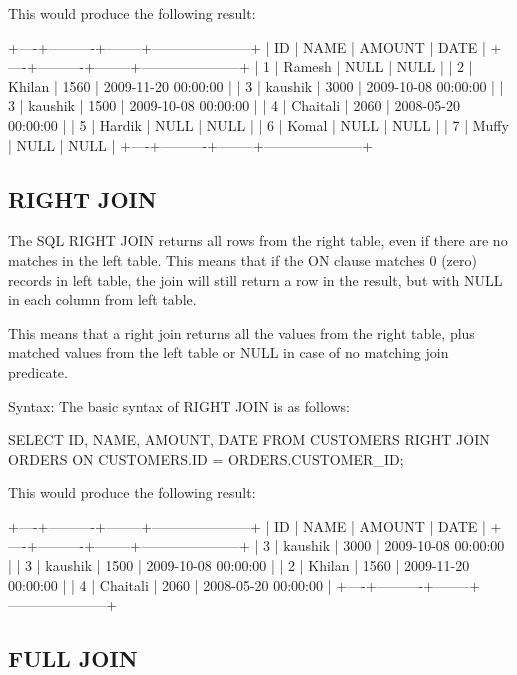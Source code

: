 This would produce the following result:

\begin{Code}
		+----+----------+--------+---------------------+
		| ID | NAME     | AMOUNT | DATE                |
		+----+----------+--------+---------------------+
		|  1 | Ramesh   |   NULL | NULL                |
		|  2 | Khilan   |   1560 | 2009-11-20 00:00:00 |
		|  3 | kaushik  |   3000 | 2009-10-08 00:00:00 |
		|  3 | kaushik  |   1500 | 2009-10-08 00:00:00 |
		|  4 | Chaitali |   2060 | 2008-05-20 00:00:00 |
		|  5 | Hardik   |   NULL | NULL                |
		|  6 | Komal    |   NULL | NULL                |
		|  7 | Muffy    |   NULL | NULL                |
		+----+----------+--------+---------------------+
\end{Code}
\subsection{RIGHT JOIN}
The SQL RIGHT JOIN returns all rows from the right table, even if there are no matches in the left table. This means that if the ON clause matches 0 (zero) records in left table, 
the join will still return a row in the result, but with NULL in each column from left table.

This means that a right join returns all the values from the right table, plus matched values from the left table or NULL in case of no matching join predicate.

Syntax:
The basic syntax of RIGHT JOIN is as follows:

\begin{Code}
	SELECT  ID, NAME, AMOUNT, DATE
	FROM CUSTOMERS
	RIGHT JOIN ORDERS
	ON CUSTOMERS.ID = ORDERS.CUSTOMER_ID;
\end{Code}

This would produce the following result:

\begin{Code}
	+----+----------+--------+---------------------+
	| ID | NAME     | AMOUNT | DATE                |
	+----+----------+--------+---------------------+
	|  3 | kaushik  |   3000 | 2009-10-08 00:00:00 |
	|  3 | kaushik  |   1500 | 2009-10-08 00:00:00 |
	|  2 | Khilan   |   1560 | 2009-11-20 00:00:00 |
	|  4 | Chaitali |   2060 | 2008-05-20 00:00:00 |
	+----+----------+--------+---------------------+
\end{Code}

\subsection{FULL JOIN}

